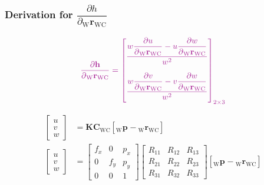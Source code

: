 \documentclass{report}
\renewcommand{\Vec}[1]{{\mathbf{#1}}}
\newcommand{\Mat}[1]{{\mathbf{#1}}}
\newcommand{\cam}{{\text{C}}}
\newcommand{\world}{{\text{W}}}
\newcommand{\KineNotationTransform}[3]{{{#1}_{#2#3}}}
\newcommand{\KineNotation}[3]{{{{}_{#2}} {#1}_{#2#3}}}
\newcommand{\KineNotationPart}[3]{{{{}_{#2}} {#1}_{#3}}}
\newcommand{\pos}{{\Vec{r}}}
\newcommand{\Pos}[2]{{\KineNotation{\pos}{#1}{#2}}}
\newcommand{\rot}{{\Mat{C}}}
\newcommand{\Rot}[2]{{\KineNotationTransform{\rot}{#1}{#2}}}
\newcommand{\point}{\Vec{p}}
\newcommand{\Pt}[1]{{\KineNotationPart{\point}{#1}{}}}
\newcommand{\camRot}{{\Rot{\world}{\cam}}}
\newcommand{\camPos}{{\Pos{\world}{\cam}}}
\newcommand{\projFunc}{{\Vec{h}}}
\begin{document}
\subsubsection*{Derivation for \color{Mulberry}
$\dfrac{\partial{h}}{\partial{\camPos}}$}

\begin{align}
  \color{Mulberry}
  \dfrac{\partial{\projFunc}}{\partial{\camPos}} =
  \begin{bmatrix}
    \dfrac{
      w \dfrac{\partial{u}}{\partial{\camPos}} -
      u \dfrac{\partial{w}}{\partial{\camPos}}
    }{w^{2}} \vspace{1.0em} \\
    \dfrac{
      w \dfrac{\partial{v}}{\partial{\camPos}} -
      v \dfrac{\partial{w}}{\partial{\camPos}}
    }{w^{2}} \vspace{0.5em}
  \end{bmatrix}_{2 \times 3}
\end{align}

\begin{align}
  \begin{bmatrix} u \\ v \\ w \end{bmatrix}
    &= \Mat{K} \camRot [\Pt{\world} - \camPos]
    \nonumber \\
  \begin{bmatrix} u \\ v \\ w \end{bmatrix}
  &= \begin{bmatrix}
      f_x & 0 & p_x \\
      0 & f_y & p_y \\
      0 & 0 & 1
  \end{bmatrix}
  \begin{bmatrix}
      R_{11} & R_{12} & R_{13} \\
      R_{21} & R_{22} & R_{23} \\
      R_{31} & R_{32} & R_{33}
  \end{bmatrix}
  [\Pt{\world} - \camPos]
  \nonumber
\end{align}
\end{document}
